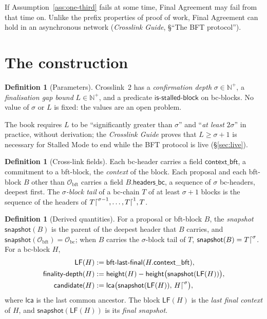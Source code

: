 \documentclass[11pt,a4paper]{article}
\theoremstyle{definition}
\newtheorem{definition}[theorem]{Definition}
\newcommand{\N}{\mathbb{N}}
\newcommand{\bc}{\mathrm{bc}}
\newcommand{\bft}{\mathrm{bft}}
\newcommand{\Origin}{\mathcal{O}}
\newcommand{\Obc}{\Origin_{\bc}}
\newcommand{\Obft}{\Origin_{\bft}}
\newcommand{\lca}{\mathsf{lca}}
\newcommand{\bftlastfinal}{\mathsf{bft\text{-}last\text{-}final}}
\newcommand{\isstalledblock}{\mathsf{is\text{-}stalled\text{-}block}}
\newcommand{\contextbft}{\mathsf{context\_bft}}
\newcommand{\headersbc}{\mathsf{headers\_bc}}
\newcommand{\snapshot}{\mathsf{snapshot}}
\newcommand{\LF}{\mathsf{LF}}
\newcommand{\candidate}{\mathsf{candidate}}
\newcommand{\finalitydepth}{\mathsf{finality\text{-}depth}}
\begin{document}
If Assumption~\ref{ass:one-third} fails at some time, Final Agreement may
fail from that time on. Unlike the prefix properties of proof of work, Final
Agreement can hold in an asynchronous network (\emph{Crosslink Guide},
\S``The BFT protocol'').

\section{The construction}\label{sec:cons}

\begin{definition}[Parameters]\label{def:params}
Crosslink~2 has a \emph{confirmation depth} $\sigma \in \N^{+}$, a
\emph{finalisation gap bound} $L \in \N^{+}$, and a predicate
$\isstalledblock$ on bc-blocks. No value of $\sigma$ or $L$ is fixed: the
values are an open problem.
\end{definition}

The book requires $L$ to be ``significantly greater than $\sigma$'' and
``\emph{at least} $2\sigma$'' in practice, without derivation; the
\emph{Crosslink Guide} proves that $L \ge \sigma + 1$ is necessary for
Stalled Mode to end while the BFT protocol is live (\S\ref{sec:live}).

\begin{definition}[Cross-link fields]\label{def:fields}
Each bc-header carries a field $\contextbft$, a commitment to a bft-block,
the \emph{context} of the block. Each proposal and each bft-block $B$ other
than $\Obft$ carries a field $B.\headersbc$, a sequence of $\sigma$
bc-headers, deepest first. The \emph{$\sigma$-block tail} of a bc-chain $T$
of at least $\sigma + 1$ blocks is the sequence of the headers of
$T\trunc{\sigma-1}, \ldots, T\trunc{1}, T$.
\end{definition}

\begin{definition}[Derived quantities]\label{def:derived}
For a proposal or bft-block $B$, the \emph{snapshot} $\snapshot(B)$ is the
parent of the deepest header that $B$ carries, and $\snapshot(\Obft) = \Obc$;
when $B$ carries the $\sigma$-block tail of $T$,
$\snapshot(B) = T\trunc{\sigma}$.
For a bc-block $H$,
\begin{align*}
  \LF(H) &:= \bftlastfinal(H.\contextbft),\\
  \finalitydepth(H) &:= \mathsf{height}(H) -
    \mathsf{height}\bigl(\snapshot(\LF(H))\bigr),\\
  \candidate(H) &:= \lca\bigl(\snapshot(\LF(H)),\, H\trunc{\sigma}\bigr),
\end{align*}
where $\lca$ is the last common ancestor. The block $\LF(H)$ is the
\emph{last final context} of $H$, and $\snapshot(\LF(H))$ is its \emph{final
snapshot}.
\end{definition}
\end{document}
